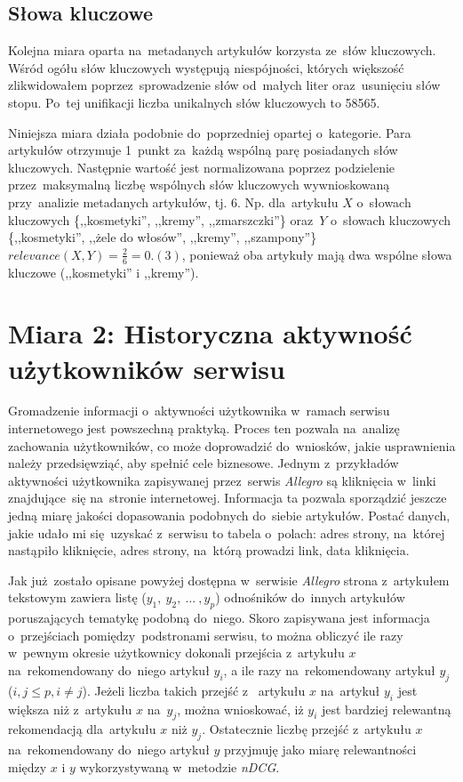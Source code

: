 \documentclass[pl]{minipw} %
\begin{document}
\subsection{Słowa kluczowe}

Kolejna miara oparta na~metadanych artykułów korzysta ze~słów kluczowych. Wśród ogółu słów kluczowych występują niespójności, których większość zlikwidowałem poprzez~sprowadzenie słów od~małych liter oraz~usunięciu słów stopu. Po~tej unifikacji liczba unikalnych słów kluczowych to 58565.

Niniejsza miara działa podobnie do~poprzedniej opartej o~kategorie. Para artykułów otrzymuje 1~punkt za~każdą wspólną parę posiadanych słów kluczowych. Następnie wartość jest normalizowana poprzez podzielenie przez~maksymalną liczbę wspólnych słów kluczowych wywnioskowaną przy~analizie metadanych artykułów, tj. 6. Np. dla~artykułu $X$ o~słowach kluczowych \{,,kosmetyki'', ,,kremy'', ,,zmarszczki''\} oraz~$Y$ o~słowach kluczowych \{,,kosmetyki'', ,,żele do włosów'', ,,kremy'', ,,szampony''\} $relevance(X,Y)=\frac{2}{6}=0.(3)$, ponieważ oba artykuły mają dwa wspólne słowa kluczowe (,,kosmetyki'' i ,,kremy'').

\section{Miara 2: Historyczna aktywność użytkowników serwisu}

Gromadzenie informacji o~aktywności użytkownika w~ramach serwisu internetowego jest powszechną praktyką. Proces ten pozwala na~analizę zachowania użytkowników, co może doprowadzić do~wniosków, jakie usprawnienia należy przedsięwziąć, aby spełnić cele biznesowe. Jednym z~przykładów aktywności użytkownika zapisywanej przez~serwis \textit{Allegro} są kliknięcia w~linki znajdujące~się na~stronie internetowej. Informacja ta pozwala sporządzić jeszcze jedną miarę jakości dopasowania podobnych do~siebie artykułów. Postać danych, jakie udało mi się~uzyskać z~serwisu to tabela o~polach: adres strony, na~której nastąpiło kliknięcie, adres strony, na~którą prowadzi link, data kliknięcia.

Jak już zostało opisane powyżej dostępna w~serwisie \textit{Allegro} strona z~artykułem tekstowym zawiera listę ($y_1,\ y_2,\ ...\ ,y_p$) odnośników do~innych artykułów poruszających tematykę podobną do~niego. Skoro zapisywana jest informacja o~przejściach pomiędzy~podstronami serwisu, to można obliczyć ile razy w~pewnym okresie użytkownicy dokonali przejścia z~artykułu $x$ na~rekomendowany do~niego artykuł $y_i$, a ile razy na~rekomendowany artykuł $y_j$ ($i,j \leq p, i\ne j$). Jeżeli liczba takich przejść z~ artykułu $x$ na~artykuł $y_i$ jest większa niż z~artykułu $x$ na~$y_j$, można wnioskować, iż $y_i$ jest bardziej relewantną rekomendacją dla~artykułu $x$ niż $y_j$. Ostatecznie liczbę przejść z~artykułu $x$ na~rekomendowany do~niego artykuł $y$ przyjmuję jako miarę relewantności między $x$ i $y$ wykorzystywaną w~metodzie \textit{nDCG}.
\end{document}
